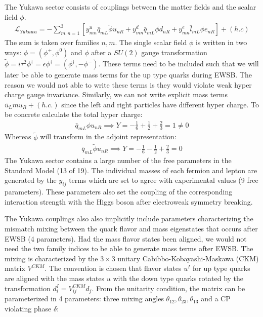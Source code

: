 The Yukawa sector consists of couplings  between the matter fields and the scalar field $\phi$.
\begin{align*}
\mathcal{L}_{Yukawa} = - \sum_{m,n=1}^3 \left [ y^u_{mn} \bar{q}_{mL} \tilde{\phi} u_{nR} + y^d_{mn} \bar{q}_{mL} \phi d_{nR}  + y_{mn}^e \bar{l}_{mL} \phi  e_{nR}  \right ] + (h.c) 
\end{align*}
The sum is taken over families $n,m$. The single scalar field $\phi$ is written in two ways: $\phi = ( \phi^+ , \phi^0)$ and $\phi$ after
a $SU(2)$ gauge transformation $\tilde{\phi} = i \tau^2 \phi^\dagger = \epsilon \phi^\dagger = 
(\phi^\dagger , -\phi^-)$. These terms need to be included such that we will
 later be able to generate mass terms for the up type quarks during EWSB. The reason
we would not able to write these terms is they would violate weak hyper charge gauge invariance.  Similarly, 
we can not write explicit mass terms $\bar{u}_Lm u_R + (h.c.)$ since the left and right particles have
different hyper charge. To be concrete calculate the total hyper charge:
\begin{align*}
\bar{q}_{mL} \phi u_{nR} \implies Y= -\frac{1}{6} + \frac{1}{2} + \frac{2}{3} = 1 \neq 0
\end{align*}
Whereas $\tilde{\phi}$ will transform in the adjoint representation:
\begin{align*}
\bar{q}_{mL} \tilde{\phi} u_{nR} \implies Y= -\frac{1}{6} - \frac{1}{2} + \frac{2}{3} = 0
\end{align*}
The Yukawa sector  contains a large number of the free parameters in the Standard Model (13 of 19). 
The individual masses of each fermion and lepton are generated by the $y_{ij}$
terms which are set to agree with experimental values (9 free parameters). These parameters 
also set the coupling of the corresponding interaction strength with the Higgs boson after electroweak symmetry
breaking.

The Yukawa couplings also also implicitly include parameters characterizing the mismatch 
mixing between the quark flavor and mass eigenstates that occurs after EWSB  (4 parameters). 
Had the mass flavor states been aligned, we would not need the two family indices to 
be able to generate mass terms after EWSB. The mixing is characterized by  the $3\times 3$ unitary
 Cabibbo-Kobayashi-Maskawa (CKM) matrix $V^{CKM}$. The convention is chosen that flavor
 states $u^I$ for up type quarks are aligned with the mass states $u$ with the down type quarks 
rotated by the transformation $d^I_i = V^{CKM}_{ij} d_{j}$. From the unitarity condition, the matrix can be
 parameterized in 4 parameters: three mixing angles $\theta_{12}, \theta_{23}, \theta_{13}$ and a CP violating phase $\delta$:

